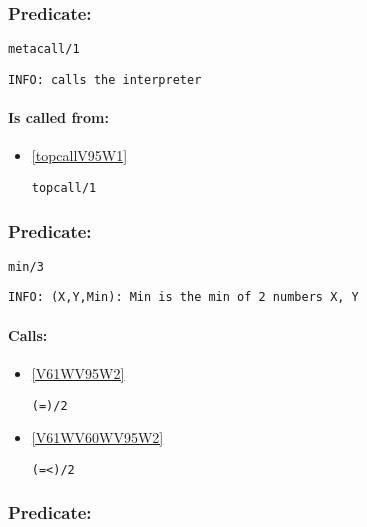\subsubsection{Predicate:} \label{metacallV95W1}

\begin{verbatim}
metacall/1
\end{verbatim}

{\small \begin{verbatim}
INFO: calls the interpreter

\end{verbatim}}
\paragraph{Is called from:} 
\begin{itemize}
\item \ref{topcallV95W1} 
\begin{verbatim}
topcall/1
\end{verbatim}

\end{itemize}

\subsubsection{Predicate:} \label{minV95W3}

\begin{verbatim}
min/3
\end{verbatim}

{\small \begin{verbatim}
INFO: (X,Y,Min): Min is the min of 2 numbers X, Y

\end{verbatim}}
\paragraph{Calls:} 
\begin{itemize}
\item \ref{V61WV95W2} 
\begin{verbatim}
(=)/2
\end{verbatim}

\item \ref{V61WV60WV95W2} 
\begin{verbatim}
(=<)/2
\end{verbatim}

\end{itemize}

\subsubsection{Predicate:} \label{mmapV95WclearV95W1}

